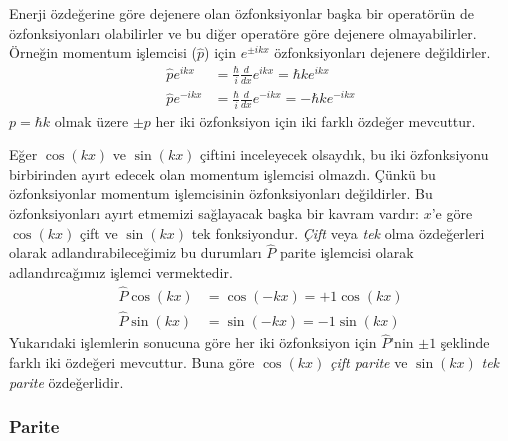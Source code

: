 \documentclass[00_kitap.tex]{subfiles}
\begin{document}
Enerji özdeğerine göre dejenere olan özfonksiyonlar başka bir operatörün de özfonksiyonları olabilirler ve bu diğer operatöre göre dejenere olmayabilirler. Örneğin momentum işlemcisi ($\hat p$) için $e^{\pm i k x}$ özfonksiyonları dejenere değildirler.
\begin{align}
\hat p e^{i k x}&=\frac{\hbar}{i} \frac{d}{d x} e^{i k x}=\hbar k e^{i k x} \nonumber\\
\hat p e^{- i k x}&=\frac{\hbar}{i} \frac{d}{d x} e^{- i k x}=- \hbar k e^{- i k x}
\end{align}
$p=\hbar k$ olmak üzere $\pm p$ her iki özfonksiyon için iki farklı özdeğer mevcuttur.

Eğer $\cos(kx)$ ve $\sin(kx)$ çiftini inceleyecek olsaydık, bu iki özfonksiyonu birbirinden ayırt edecek olan momentum işlemcisi olmazdı. Çünkü bu özfonksiyonlar momentum işlemcisinin özfonksiyonları değildirler. Bu özfonksiyonları ayırt etmemizi sağlayacak başka bir kavram vardır: $x$'e göre $\cos(kx)$ çift ve $\sin(kx)$ tek fonksiyondur. \emph{Çift} veya \emph{tek} olma özdeğerleri olarak adlandırabileceğimiz bu durumları $\hat P$ parite işlemcisi olarak adlandırcağımız işlemci vermektedir.
\begin{align}
\hat P \cos( k x)&= \cos( - k x) = +1 \cos(k x)  \nonumber\\
\hat P \sin( k x)&= \sin( - k x) = -1 \sin(k x)
\end{align}
Yukarıdaki işlemlerin sonucuna göre her iki özfonksiyon için $\hat P$'nin $\pm 1$ şeklinde farklı iki özdeğeri mevcuttur. Buna göre $\cos(kx)$ \emph{çift parite} ve $\sin(kx)$ \emph{tek parite} özdeğerlidir.


\subsubsection{Parite}


\end{document}
